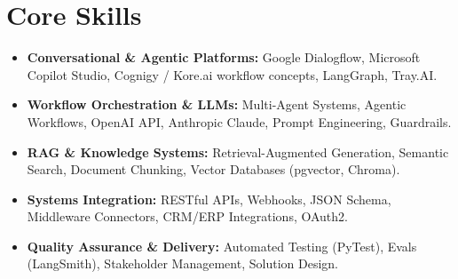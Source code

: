 \documentclass[a4paper,10pt]{article}
\begin{document}
\section{Core Skills}
\begin{itemize}
  \item \textbf{Conversational \& Agentic Platforms:} Google Dialogflow, Microsoft Copilot Studio, Cognigy / Kore.ai workflow concepts, LangGraph, Tray.AI.
  \item \textbf{Workflow Orchestration \& LLMs:} Multi-Agent Systems, Agentic Workflows, OpenAI API, Anthropic Claude, Prompt Engineering, Guardrails.
  \item \textbf{RAG \& Knowledge Systems:} Retrieval-Augmented Generation, Semantic Search, Document Chunking, Vector Databases (pgvector, Chroma).
  \item \textbf{Systems Integration:} RESTful APIs, Webhooks, JSON Schema, Middleware Connectors, CRM/ERP Integrations, OAuth2.
  \item \textbf{Quality Assurance \& Delivery:} Automated Testing (PyTest), Evals (LangSmith), Stakeholder Management, Solution Design.
\end{itemize}
\end{document}
